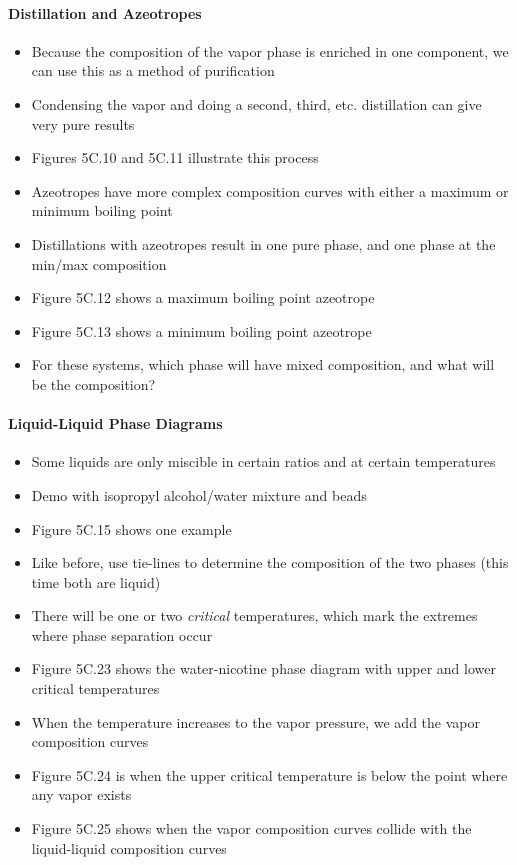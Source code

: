 \documentclass[12pt, openany, letterpaper]{memoir}
\begin{document}
\paragraph{Distillation and Azeotropes}
\begin{itemize}
	\item Because the composition of the vapor phase is enriched in one component, we can use this as a method of purification
	\item Condensing the vapor and doing a second, third, etc. distillation can give very pure results
	\item Figures 5C.10 and 5C.11 illustrate this process
	\item Azeotropes have more complex composition curves with either a maximum or minimum boiling point
	\item Distillations with azeotropes result in one pure phase, and one phase at the min/max composition
	\item Figure 5C.12 shows a maximum boiling point azeotrope
	\item Figure 5C.13 shows a minimum boiling point azeotrope
	\item For these systems, which phase will have mixed composition, and what will be the composition?
\end{itemize}
\paragraph{Liquid-Liquid Phase Diagrams}
\begin{itemize}
	\item Some liquids are only miscible in certain ratios and at certain temperatures
	\item Demo with isopropyl alcohol/water mixture and beads
	\item Figure 5C.15 shows one example
	\item Like before, use tie-lines to determine the composition of the two phases (this time both are liquid)
	\item There will be one or two \emph{critical} temperatures, which mark the extremes where phase separation occur
	\item Figure 5C.23 shows the water-nicotine phase diagram with upper and lower critical temperatures
	\item When the temperature increases to the vapor pressure, we add the vapor composition curves
	\item Figure 5C.24 is when the upper critical temperature is below the point where any vapor exists
	\item Figure 5C.25 shows when the vapor composition curves collide with the liquid-liquid composition curves
\end{itemize}
\end{document}
